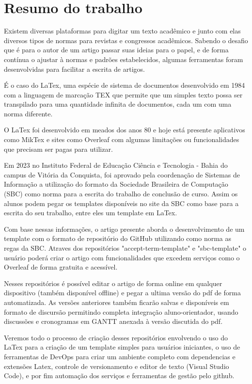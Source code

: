 \section{Resumo do trabalho}

Existem diversas plataformas para digitar um texto acadêmico e junto com elas diversos tipos de normas para revistas e congressos acadêmicos. Sabendo o desafio que é para o autor de um artigo passar suas ideias para o papel, e de forma contínua o ajustar à normas e padrões estabelecidos, algumas ferramentas foram desenvolvidas para facilitar a escrita de artigos.

É o caso do LaTex, uma espécie de sistema de documentos desenvolvido em 1984 com a linguagem de marcação TEX que permite que um simples texto possa ser transpilado para uma quantidade infinita de documentos, cada um com uma norma diferente.

O LaTex foi desenvolvido em meados dos anos 80 e hoje está presente aplicativos como MikTex e sites como Overleaf com algumas limitações ou funcionalidades que precisam ser pagas para utilizar.

Em 2023 no Instituto Federal de Educação Ciência e Tecnologia - Bahia do campus de Vitória da Conquista, foi aprovado pela coordenação de Sistemas de Informação a utilização do formato da Sociedade Brasileira de Computação (SBC) como norma para a escrita do trabalho de conclusão de curso. Assim os alunos podem pegar os templates disponíveis no site da SBC como base para a escrita do seu trabalho, entre eles um template em LaTex.

Com base nessas informações, o artigo presente aborda o desenvolvimento de um template com o formato de repositório do GitHub utilizando como norma as regas da SBC. Atraves dos repositórios "accept-term-template" e "sbc-template" o usuário poderá criar o artigo com funcionalidades que excedem serviços como o Overleaf de forma gratuita e acessível.

Nesses repositórios é possível editar o artigo de forma online em qualquer dispositivo (também disponível offline) e pegar a ultima versão do pdf de forma automatizada. As versões anteriores também ficarão salvas e disponíveis em formato de discursão permitindo completa integração aluno-orientador, usando discussões e cronogramas em GANTT anexada à versão discutida do pdf.

Veremos todo o processo de criação desses repositórios envolvendo o uso do LaTex para a criação de um template simples para usuários iniciantes, o uso de ferramentas de DevOps para criar um ambiente completo com dependencias e extensões Latex, controle de versionamento e editor de texto (Visual Studio Code), e por fim automação dos serviços e ferramentas de gestão pelo github.
